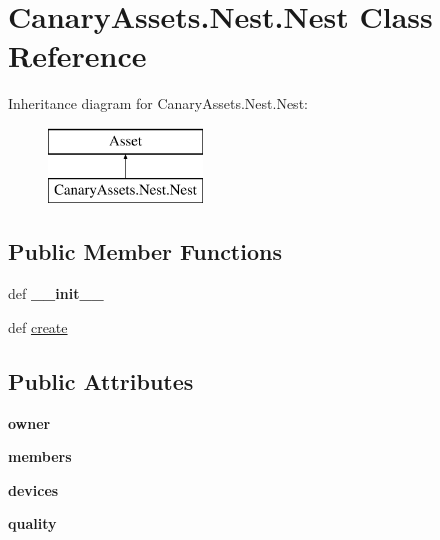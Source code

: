 \hypertarget{class_canary_assets_1_1_nest_1_1_nest}{\section{Canary\-Assets.\-Nest.\-Nest Class Reference}
\label{class_canary_assets_1_1_nest_1_1_nest}
}
Inheritance diagram for Canary\-Assets.\-Nest.\-Nest\-:\begin{figure}[H]
\begin{center}
\leavevmode
\includegraphics[height=2.000000cm]{class_canary_assets_1_1_nest_1_1_nest}
\end{center}
\end{figure}
\subsection*{Public Member Functions}
\begin{DoxyCompactItemize}
\item 
\hypertarget{class_canary_assets_1_1_nest_1_1_nest_a699269ce903225dca30cd976e4023e70}{def {\bfseries \-\_\-\-\_\-init\-\_\-\-\_\-}}\label{class_canary_assets_1_1_nest_1_1_nest_a699269ce903225dca30cd976e4023e70}

\item 
def \hyperlink{class_canary_assets_1_1_nest_1_1_nest_a557e617357bf28fcd96d31d980deeff9}{create}
\end{DoxyCompactItemize}
\subsection*{Public Attributes}
\begin{DoxyCompactItemize}
\item 
\hypertarget{class_canary_assets_1_1_nest_1_1_nest_a4bb0ecd5e3c3fe14c1b4d0236a4e2e97}{{\bfseries owner}}\label{class_canary_assets_1_1_nest_1_1_nest_a4bb0ecd5e3c3fe14c1b4d0236a4e2e97}

\item 
\hypertarget{class_canary_assets_1_1_nest_1_1_nest_aaf67343a84818206762d2578056b1f2a}{{\bfseries members}}\label{class_canary_assets_1_1_nest_1_1_nest_aaf67343a84818206762d2578056b1f2a}

\item 
\hypertarget{class_canary_assets_1_1_nest_1_1_nest_a9b1ae23c66abc485fb9f9d1402a0f5e2}{{\bfseries devices}}\label{class_canary_assets_1_1_nest_1_1_nest_a9b1ae23c66abc485fb9f9d1402a0f5e2}

\item 
\hypertarget{class_canary_assets_1_1_nest_1_1_nest_a03a0f34c05b34caa402609415dd7e12b}{{\bfseries quality}}\label{class_canary_assets_1_1_nest_1_1_nest_a03a0f34c05b34caa402609415dd7e12b}

\end{DoxyCompactItemize}


